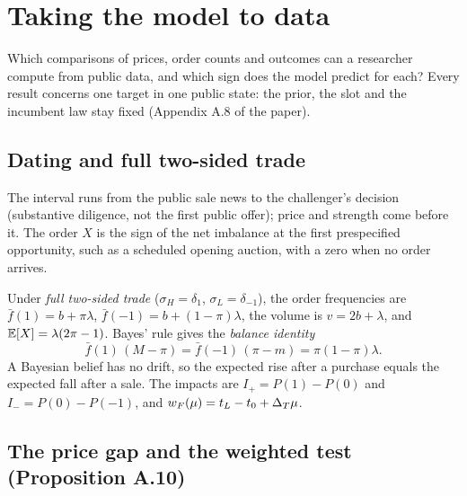 \chapter{Taking the model to data}\label{ch:empirical}

\begin{chapterplan}
Which comparisons of prices, order counts and outcomes can a researcher compute from public data, and which sign does
the model predict for each? Every result concerns one target in one public state: the prior, the slot and the
incumbent law stay fixed (Appendix A.8 of the paper).
\end{chapterplan}

\section{Dating and full two-sided trade}\label{sec:empirical-dating}

The interval runs from the public sale news to the challenger's decision (substantive diligence, not the first
public offer); price and strength come before it. The order \(X\) is the sign of the net imbalance at the first
prespecified opportunity, such as a scheduled opening auction, with a zero when no order arrives.

Under \emph{full two-sided trade} (\(\sigma_H=\delta_1\), \(\sigma_L=\delta_{-1}\)), the order frequencies are
\(\bar f(1)=b+\pi\lambda\), \(\bar f(-1)=b+(1-\pi)\lambda\), the volume is \(v=2b+\lambda\), and
\(\mathbb{E}[X]=\lambda(2\pi-1)\). Bayes' rule gives the \emph{balance identity}
\begin{equation}\label{eq:empirical-balance}
\bar f(1)\,(M-\pi)=\bar f(-1)\,(\pi-m)=\pi(1-\pi)\lambda .
\end{equation}
A Bayesian belief has no drift, so the expected rise after a purchase equals the expected fall after a sale. The
impacts are \(I_+=P(1)-P(0)\) and \(I_-=P(0)-P(-1)\), and \(w_F(\mu)=t_L-t_0+\Delta_T\mu\).

\section{The price gap and the weighted test (Proposition A.10)}\label{sec:empirical-spread}

